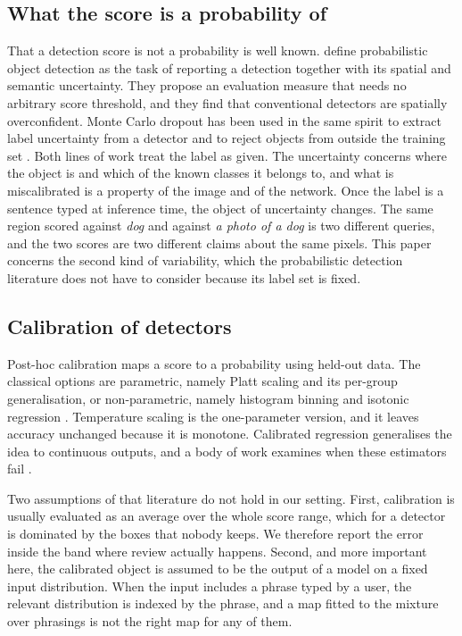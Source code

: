 \subsection{What the score is a probability of}

That a detection score is not a probability is well known. \citet{hall2020probabilistic}
define probabilistic object detection as the task of reporting a detection together with its
spatial and semantic uncertainty. They propose an evaluation measure that needs no arbitrary
score threshold, and they find that conventional detectors are spatially overconfident. Monte
Carlo dropout has been used in the same spirit to extract label uncertainty from a detector
and to reject objects from outside the training set \citep{miller2018dropout}. Both lines of
work treat the label as given. The uncertainty concerns where the object is and which of the
known classes it belongs to, and what is miscalibrated is a property of the image and of the
network. Once the label is a sentence typed at inference time, the object of uncertainty
changes. The same region scored against \emph{dog} and against \emph{a photo of a dog} is two
different queries, and the two scores are two different claims about the same pixels. This
paper concerns the second kind of variability, which the probabilistic detection literature
does not have to consider because its label set is fixed.

\subsection{Calibration of detectors}

Post-hoc calibration maps a score to a probability using held-out data. The classical options
are parametric, namely Platt scaling \citep{platt1999probabilistic} and its per-group
generalisation, or non-parametric, namely histogram binning and isotonic regression
\citep{zadrozny2002transforming}. Temperature scaling \citep{guo2017calibration} is the
one-parameter version, and it leaves accuracy unchanged because it is monotone. Calibrated
regression \citep{kuleshov2018accurate} generalises the idea to continuous outputs, and a body
of work examines when these estimators fail
\citep{vaicenavicius2019evaluating,nixon2019measuring,wang2023calibration}.

Two assumptions of that literature do not hold in our setting. First, calibration is usually
evaluated as an average over the whole score range, which for a detector is dominated by the
boxes that nobody keeps. We therefore report the error inside the band where review actually
happens. Second, and more important here, the calibrated object is assumed to be the output of
a model on a fixed input distribution. When the input includes a phrase typed by a user, the
relevant distribution is indexed by the phrase, and a map fitted to the mixture over phrasings
is not the right map for any of them.

